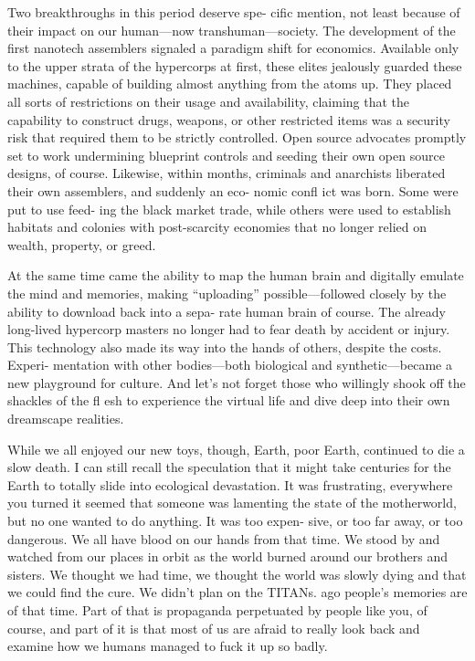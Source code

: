Two breakthroughs in this period deserve spe-
cific mention, not least because of their impact on our 
human—now transhuman—society. The development 
of the first nanotech assemblers signaled a paradigm 
shift for economics. Available only to the upper 
strata of the hypercorps at first, these elites jealously 
guarded these machines, capable of building almost 
anything from the atoms up. They placed all sorts of 
restrictions on their usage and availability, claiming 
that the capability to construct drugs, weapons, or 
other restricted items was a security risk that required 
them to be strictly controlled. Open source advocates 
promptly set to work undermining blueprint controls 
and seeding their own open source designs, of course. 
Likewise, within months, criminals and anarchists 
liberated their own assemblers, and suddenly an eco-
nomic confl ict was born. Some were put to use feed-
ing the black market trade, while others were used 
to establish habitats and colonies with post-scarcity 
economies that no longer relied on wealth, property, 
or greed.

At the same time came the ability to map the 
human brain and digitally emulate the mind and 
memories, making ``uploading'' possible—followed 
closely by the ability to download back into a sepa-
rate human brain of course. The already long-lived 
hypercorp masters no longer had to fear death by 
accident or injury. This technology also made its way 
into the hands of others, despite the costs. Experi-
mentation with other bodies—both biological and 
synthetic—became a new playground for culture. 
And let's not forget those who willingly shook off the 
shackles of the fl esh to experience the virtual life and 
dive deep into their own dreamscape realities.

While we all enjoyed our new toys, though, Earth, 
poor Earth, continued to die a slow death. I can still 
recall the speculation that it might take centuries for 
the Earth to totally slide into ecological devastation. It 
was frustrating, everywhere you turned it seemed that 
someone was lamenting the state of the motherworld, 
but no one wanted to do anything. It was too expen-
sive, or too far away, or too dangerous. We all have 
blood on our hands from that time. We stood by and 
watched from our places in orbit as the world burned 
around our brothers and sisters. We thought we had 
time, we thought the world was slowly dying and that 
we could find the cure. We didn't plan on the TITANs.
ago
people's memories are of that time. Part of that is 
propaganda perpetuated by people like you, of course, 
and part of it is that most of us are afraid to really 
look back and examine how we humans managed to 
fuck it up so badly.

